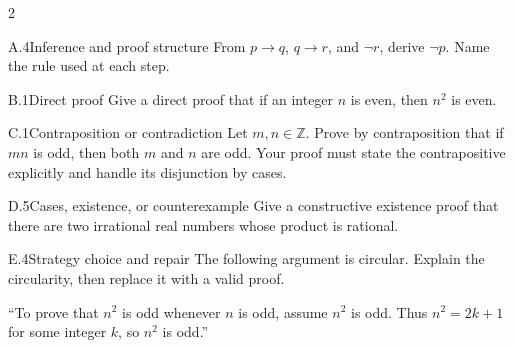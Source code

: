 \documentclass[9pt]{extarticle}
\begin{document}
\CoreWorkArea
\FormBreak
{}
\begin{multicols}{2}
\begin{CoreProblem}{A.4}{Inference and proof structure}
From $p\to q$, $q\to r$, and $\neg r$, derive $\neg p$. Name the rule used at
each step.
\end{CoreProblem}
\begin{CoreProblem}{B.1}{Direct proof}
Give a direct proof that if an integer $n$ is even, then $n^2$ is even.
\end{CoreProblem}
\begin{CoreProblem}{C.1}{Contraposition or contradiction}
Let $m,n\in\mathbb Z$. Prove by contraposition that if $mn$ is odd, then both
$m$ and $n$ are odd. Your proof must state the contrapositive explicitly and
handle its disjunction by cases.
\end{CoreProblem}
\columnbreak
\begin{CoreProblem}{D.5}{Cases, existence, or counterexample}
Give a constructive existence proof that there are two irrational real numbers
whose product is rational.
\end{CoreProblem}
\begin{CoreProblem}{E.4}{Strategy choice and repair}
The following argument is circular. Explain the circularity, then replace it with a valid proof.

``To prove that $n^2$ is odd whenever $n$ is odd, assume $n^2$ is odd. Thus
$n^2=2k+1$ for some integer $k$, so $n^2$ is odd.''
\end{CoreProblem}
\end{multicols}
\CoreWorkArea
\FormBreak
{}
\end{document}

